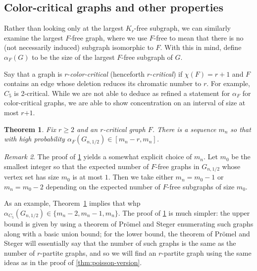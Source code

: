 \documentclass[11pt]{article}
\newtheorem{theorem}{Theorem}
\theoremstyle{definition}
\theoremstyle{remark}
\newtheorem{remark}[theorem]{Remark}
\begin{document}
\subsection{Color-critical graphs and other properties} \label{sec:other-properties}

Rather than looking only at the largest $K_r$-free subgraph, we can similarly examine the largest $F$-free graph, where we use $F$-free to mean that there is no (not necessarily induced) subgraph  isomorphic to $F$.  With this in mind, define $\alpha_F(G)$ to be the size of the largest $F$-free subgraph of $G$.  


Say that a graph is $r$-{\em color-critical} (henceforth $r$-{\em critical}) if $\chi(F)=r+1$ and $F$  contains an edge whose deletion reduces its chromatic number to $r$. For example, $C_5$ is 2-critical. While we are not able to deduce as refined a statement for $\alpha_F$ for color-critical graphs, we are able to show concentration on an interval of  size at most $r{+1}$.



\begin{theorem}\label{thm:color-critical-concentration}
    Fix $r \geq 2$ and an $r$-critical graph $F$.  There is a sequence $m_n$ so that with high probability $\alpha_F(G_{n,1/2}) \in [m_n-r,m_n]$.
\end{theorem}

\begin{remark}
    The proof of \cref{thm:color-critical-concentration} yields a somewhat explicit choice of $m_n$.  Let $m_0$ be the smallest integer so that the expected number of $F$-free graphs in $G_{n,1/2}$ whose vertex set has size $m_0$ is at most $1$.  Then we take either $m_n = m_0 -1$ or $m_n = m_0 - 2$ depending on the expected number of $F$-free subgraphs of size $m_0$.
\end{remark}


As an example, Theorem~\ref{thm:color-critical-concentration} implies that whp $\alpha_{C_5}(G_{n,1/2}) \in \{m_n-2, m_n-1, m_n\}$.  The proof of \cref{thm:color-critical-concentration} is much simpler: the upper bound is given by using a theorem of Pr\"omel and Steger enumerating such graphs along with a basic union bound; for the lower bound, the theorem of Pr\"omel and Steger will essentially say that the number of such graphs is the same as the number of $r$-partite graphs, and so we will find an $r$-partite graph using the same ideas as in the proof of \cref{thm:poisson-version}. 
\end{document}
